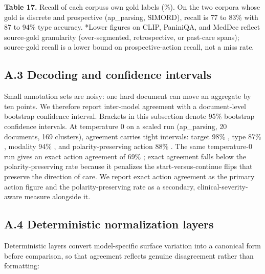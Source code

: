\textbf{Table 17.} Recall of each corpus\textquotesingle s own gold labels (\%). On the two corpora whose gold is discrete and prospective (ap\_parsing, SIMORD), recall is 77 to 83\% with 87 to 94\% type accuracy. *Lower figures on CLIP, PaniniQA, and MedDec reflect source-gold granularity (over-segmented, retrospective, or past-care spans); source-gold recall is a lower bound on prospective-action recall, not a miss rate.

\subsection{A.3 Decoding and confidence intervals}\label{a.3-decoding-and-confidence-intervals}

Small annotation sets are noisy: one hard document can move an aggregate by ten points. We therefore report inter-model agreement with a document-level bootstrap confidence interval. Brackets in this subsection denote 95\% bootstrap confidence intervals. At temperature 0 on a scaled run (ap\_parsing, 20 documents, 169 clusters), agreement carries tight intervals: target 98\% \cite{ref96, ref100}, type 87\% \cite{ref82, ref92}, modality 94\% \cite{ref89, ref98}, and polarity-preserving action 88\% \cite{ref83, ref92}. The same temperature-0 run gives an exact action agreement of 69\% \cite{ref60, ref77}; exact agreement falls below the polarity-preserving rate because it penalizes the start-versus-continue flips that preserve the direction of care. We report exact action agreement as the primary action figure and the polarity-preserving rate as a secondary, clinical-severity-aware measure alongside it.

\subsection{A.4 Deterministic normalization layers}\label{a.4-deterministic-normalization-layers}

Deterministic layers convert model-specific surface variation into a canonical form before comparison, so that agreement reflects genuine disagreement rather than formatting:

